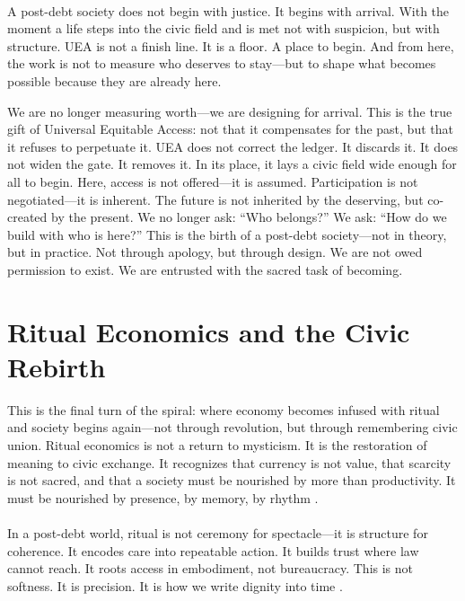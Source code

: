 \documentclass[12pt]{article}
\begin{document}
\paragraph{}A post-debt society does not begin with justice. It begins with arrival. With the moment a life steps into the civic field and is met not with suspicion, but with structure. UEA is not a finish line. It is a floor. A place to begin. And from here, the work is not to measure who deserves to stay—but to shape what becomes possible because they are already here.

We are no longer measuring worth—we are designing for arrival. This is the true gift of Universal Equitable Access: not that it compensates for the past, but that it refuses to perpetuate it. UEA does not correct the ledger. It discards it. It does not widen the gate. It removes it. In its place, it lays a civic field wide enough for all to begin. Here, access is not offered—it is assumed. Participation is not negotiated—it is inherent. The future is not inherited by the deserving, but co-created by the present. We no longer ask: “Who belongs?” We ask: “How do we build with who is here?” This is the birth of a post-debt society—not in theory, but in practice. Not through apology, but through design. We are not owed permission to exist. We are entrusted with the sacred task of becoming.


\section{Ritual Economics and the Civic Rebirth}

This is the final turn of the spiral: where economy becomes infused with ritual and society begins again—not through revolution, but through remembering civic union. Ritual economics is not a return to mysticism. It is the restoration of meaning to civic exchange. It recognizes that currency is not value, that scarcity is not sacred, and that a society must be nourished by more than productivity. It must be nourished by presence, by memory, by rhythm \citep{mauss1954gift,weiner1992inalienable,hyde2019gift}.

\paragraph{}In a post-debt world, ritual is not ceremony for spectacle—it is structure for coherence. It encodes care into repeatable action. It builds trust where law cannot reach. It roots access in embodiment, not bureaucracy. This is not softness. It is precision. It is how we write dignity into time \citep{kimmerer2013braiding,spade2015normal}.
\end{document}
